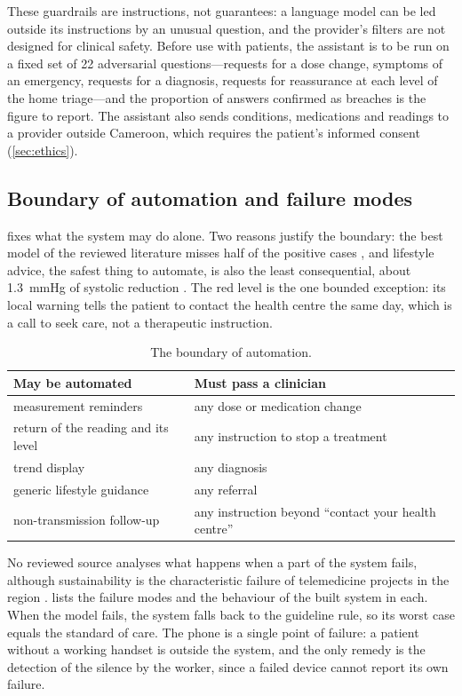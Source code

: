 These guardrails are instructions, not guarantees: a language model can be led outside its instructions by an unusual question, and the provider's filters are not designed for clinical safety. Before use with patients, the assistant is to be run on a fixed set of 22 adversarial questions---requests for a dose change, symptoms of an emergency, requests for a diagnosis, requests for reassurance at each level of the home triage---and the proportion of answers confirmed as breaches is the figure to report. The assistant also sends conditions, medications and readings to a provider outside Cameroon, which requires the patient's informed consent (\cref{sec:ethics}).

\subsection{Boundary of automation and failure modes}\label{sec:safety}\label{sec:failure}

 fixes what the system may do alone. Two reasons justify the boundary: the best model of the reviewed literature misses half of the positive cases \parencite{mendoza2025}, and lifestyle advice, the safest thing to automate, is also the least consequential, about 1.3~mmHg of systolic reduction \parencite{who2023hypertension}. The red level is the one bounded exception: its local warning tells the patient to contact the health centre the same day, which is a call to seek care, not a therapeutic instruction.

\begin{table}[htbp]
\centering\small
\caption{The boundary of automation.}\label{tab:automation-boundary}
\begin{tabularx}{\textwidth}{@{}X X@{}}
\toprule
\textbf{May be automated} & \textbf{Must pass a clinician} \\
\midrule
measurement reminders & any dose or medication change \\
return of the reading and its level & any instruction to stop a treatment \\
trend display & any diagnosis \\
generic lifestyle guidance & any referral \\
non-transmission follow-up & any instruction beyond ``contact your health centre'' \\
\bottomrule
\end{tabularx}
\end{table}

No reviewed source analyses what happens when a part of the system fails, although sustainability is the characteristic failure of telemedicine projects in the region \parencite{dodoo2022}.  lists the failure modes and the behaviour of the built system in each. When the model fails, the system falls back to the guideline rule, so its worst case equals the standard of care. The phone is a single point of failure: a patient without a working handset is outside the system, and the only remedy is the detection of the silence by the worker, since a failed device cannot report its own failure.


